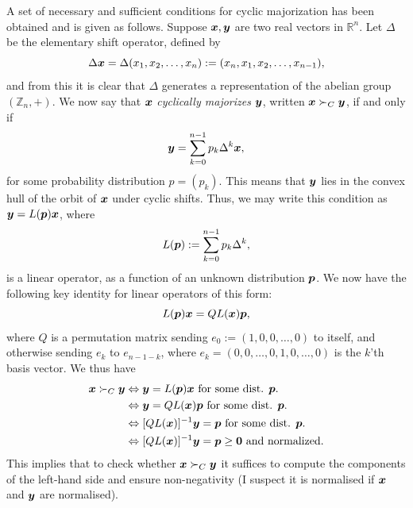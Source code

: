\documentclass[pra,
aps,
twocolumn,
superscriptaddress,
groupedaddress,
nofootinbib,
reprint
]{revtex4-1}
\begin{document}
A set of necessary and sufficient conditions for cyclic majorization has been obtained and is given as follows. Suppose $\boldsymbol{x}, \boldsymbol{y}$ are two real vectors in $\mathbb{R}^n$. Let $\Delta$ be the elementary shift operator, defined by
\begin{equation}
\Delta \boldsymbol{x} = \Delta (x_1, x_2, \dots, x_n) := (x_n, x_1, x_2, \dots, x_{n-1}),
\end{equation}
and from this it is clear that $\Delta$ generates a representation of the abelian group $(\mathbb{Z}_n,+)$.
We now say that $\boldsymbol{x}$ \emph{cyclically majorizes} $\boldsymbol{y}$, written $\boldsymbol{x} \succ_C \boldsymbol{y}$, if and only if 
\begin{equation}
\boldsymbol{y} = \sum_{k=0}^{n-1} p_k \Delta^k \boldsymbol{x},
\end{equation}
for some probability distribution $p=(p_k)$. This means that $\boldsymbol{y}$ lies in the convex hull of the orbit of $\boldsymbol{x}$ under cyclic shifts. Thus, we may write this condition as $\boldsymbol{y} = L(\boldsymbol{p}) \boldsymbol{x}$, where
\begin{equation}
L(\boldsymbol{p}) :=  \sum_{k=0}^{n-1} p_k \Delta^k,
\end{equation}
is a linear operator, as a function of an unknown distribution $\boldsymbol{p}$. We now have the following key identity for linear operators of this form:
\begin{equation}
L(\boldsymbol{p})\boldsymbol{x} = QL(\boldsymbol{x}) \boldsymbol{p},
\end{equation}
where $Q$ is a permutation matrix sending $e_0:=(1,0,0,\dots ,0)$ to itself, and otherwise sending $e_k$ to $e_{n-1-k}$, where $e_k=  (0,0,\dots, 0,1,0,\dots, 0)$ is the $k$'th basis vector. We thus have
\begin{align}
\boldsymbol{x} \succ_C \boldsymbol{y} &\Leftrightarrow \boldsymbol{y} = L(\boldsymbol{p}) \boldsymbol{x} \mbox{ for some dist. } \boldsymbol{p}. \nonumber \\
&\Leftrightarrow \boldsymbol{y} = QL(\boldsymbol{x}) \boldsymbol{p} \mbox{ for some dist. } \boldsymbol{p}. \nonumber \\
&\Leftrightarrow [QL(\boldsymbol{x})]^{-1}\boldsymbol{y} = \boldsymbol{p} \mbox{ for some dist. } \boldsymbol{p}. \nonumber \\
&\Leftrightarrow [QL(\boldsymbol{x})]^{-1}\boldsymbol{y} = \boldsymbol{p}  \ge \mathbf{0} \mbox{ and normalized}.
\end{align}
This implies that to check whether $\boldsymbol{x} \succ_C \boldsymbol{y}$ it suffices to compute the components of the left-hand side and ensure non-negativity (I suspect it is normalised if $\boldsymbol{x}$ and $\boldsymbol{y}$ are normalised).
\end{document}
